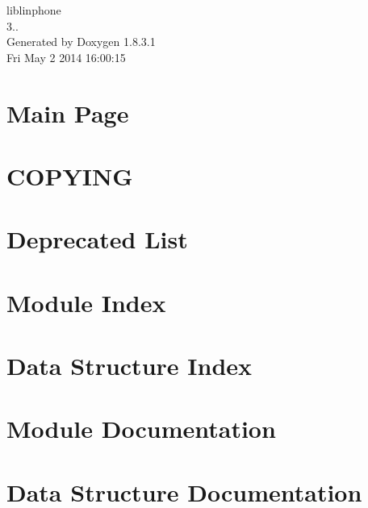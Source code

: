 \documentclass{book}
\begin{document}
\begin{titlepage}
\vspace*{7cm}
\begin{center}
{\Large liblinphone \\[1ex]\large 3.. }\\
\vspace*{1cm}
{\large Generated by Doxygen 1.8.3.1}\\
\vspace*{0.5cm}
{\small Fri May 2 2014 16:00:15}\\
\end{center}
\end{titlepage}
\clearemptydoublepage
{}
\tableofcontents
\clearemptydoublepage
{}
\chapter{Main Page}
\label{index}
\chapter{C\-O\-P\-Y\-I\-N\-G}
\label{liblinphone_license}

\chapter{Deprecated List}
\label{deprecated}

\chapter{Module Index}

\chapter{Data Structure Index}

\chapter{Module Documentation}
























\chapter{Data Structure Documentation}






\printindex
\end{document}
